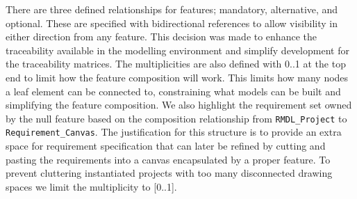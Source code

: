 There are three defined relationships for features; mandatory, alternative, and optional. These are specified with bidirectional references to allow visibility in either direction from any feature. This decision was made to enhance the traceability available in the modelling environment and simplify development for the traceability matrices. The multiplicities are also defined with 0..1 at the top end to limit how the feature composition will work. This limits how many nodes a leaf element can be connected to, constraining what models can be built and simplifying the feature composition. We also highlight the requirement set owned by the null feature based on the composition relationship from \texttt{RMDL\_Project} to \texttt{Requirement\_Canvas}. The justification for this structure is to provide an extra space for requirement specification that can later be refined by cutting and pasting the  requirements into a canvas encapsulated by a proper feature. To prevent cluttering instantiated projects with too many disconnected drawing spaces we limit the multiplicity to [0..1].



